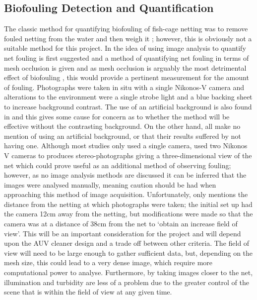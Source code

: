 \documentclass[11.5pt, twoside, a4paper]{article}
\begin{document}
\subsection{Biofouling Detection and Quantification}
The classic method for quantifying biofouling of fish-cage netting was to remove fouled netting from the water and then weigh it \cite{hodson1995situ}; however, this is obviously not a suitable method for this project. In \cite{hodson2000biofouling} the idea of using image analysis to quantify net fouling is first suggested and a method of quantifying net fouling in terms of mesh occlusion is given and as mesh occlusion is arguably the most detrimental effect of biofouling \cite{beveridge2008cage,fitridge2012impact,braithwaite2004marine}, this would provide a pertinent measurement for the amount of fouling.  Photographs were taken in situ with a single Nikonos-V camera and alterations to the environment were a single strobe light and a blue backing sheet to increase background contrast. The use of an artificial background is also found in \cite{braithwaite2007biofouling,edwards2015effectiveness} and this gives some cause for concern as to whether the method will be effective without the contrasting background. On the other hand, \cite{guenther2010development,svane2006test} all make no mention of using an artificial background, or that their results suffered by not having one. Although most studies \cite{braithwaite2007biofouling,guenther2010development,edwards2015effectiveness,gansel2015drag} only used a single camera, \cite{svane2006test} used two Nikonos V cameras to produces stereo-photographs giving a three-dimensional view of the net which could prove useful as an additional method of observing fouling; however, as no image analysis methods are discussed it can be inferred that the images were analysed manually, meaning caution should be had when approaching this method of image acquisition. Unfortunately, only \cite{guenther2010development} mentions the distance from the netting at which photographs were taken; the initial set up had the camera 12cm away from the netting, but modifications were made so that the camera was at a distance of 38cm from the net to `obtain an increase field of view'. This will be an important consideration for the project and will depend upon the AUV cleaner design and a trade off between other criteria. The field of view will need to be large enough to gather sufficient data, but, depending on the mesh size, this could lead to a very dense image, which require more computational power to analyse. Furthermore, by taking images closer to the net, illumination and turbidity are less of a problem due to the greater control of the scene that is within the field of view at any given time.
\end{document}
